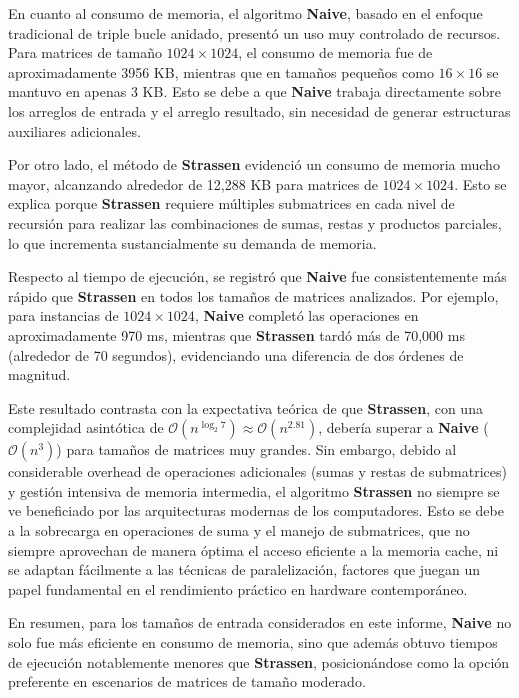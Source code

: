 En cuanto al consumo de memoria, el algoritmo \textbf{Naive}, basado en el enfoque tradicional de triple bucle anidado, presentó un uso muy controlado de recursos. Para matrices de tamaño $1024 \times 1024$, el consumo de memoria fue de aproximadamente 3956 KB, mientras que en tamaños pequeños como $16 \times 16$ se mantuvo en apenas 3 KB. Esto se debe a que \textbf{Naive} trabaja directamente sobre los arreglos de entrada y el arreglo resultado, sin necesidad de generar estructuras auxiliares adicionales.

Por otro lado, el método de \textbf{Strassen} evidenció un consumo de memoria mucho mayor, alcanzando alrededor de 12,288 KB para matrices de $1024 \times 1024$. Esto se explica porque \textbf{Strassen} requiere múltiples submatrices en cada nivel de recursión para realizar las combinaciones de sumas, restas y productos parciales, lo que incrementa sustancialmente su demanda de memoria.

Respecto al tiempo de ejecución, se registró que \textbf{Naive} fue consistentemente más rápido que \textbf{Strassen} en todos los tamaños de matrices analizados. Por ejemplo, para instancias de $1024 \times 1024$, \textbf{Naive} completó las operaciones en aproximadamente 970 ms, mientras que \textbf{Strassen} tardó más de 70,000 ms (alrededor de 70 segundos), evidenciando una diferencia de dos órdenes de magnitud.

Este resultado contrasta con la expectativa teórica de que \textbf{Strassen}, con una complejidad asintótica de $\mathcal{O}(n^{\log_2 7}) \approx \mathcal{O}(n^{2.81})$, debería superar a \textbf{Naive} ($\mathcal{O}(n^3)$) para tamaños de matrices muy grandes. Sin embargo, debido al considerable overhead de operaciones adicionales (sumas y restas de submatrices) y gestión intensiva de memoria intermedia, el algoritmo \textbf{Strassen} no siempre se ve beneficiado por las arquitecturas modernas de los computadores. Esto se debe a la sobrecarga en operaciones de suma y el manejo de submatrices, que no siempre aprovechan de manera óptima el acceso eficiente a la memoria cache, ni se adaptan fácilmente a las técnicas de paralelización, factores que juegan un papel fundamental en el rendimiento práctico en hardware contemporáneo.

En resumen, para los tamaños de entrada considerados en este informe, \textbf{Naive} no solo fue más eficiente en consumo de memoria, sino que además obtuvo tiempos de ejecución notablemente menores que \textbf{Strassen}, posicionándose como la opción preferente en escenarios de matrices de tamaño moderado.

